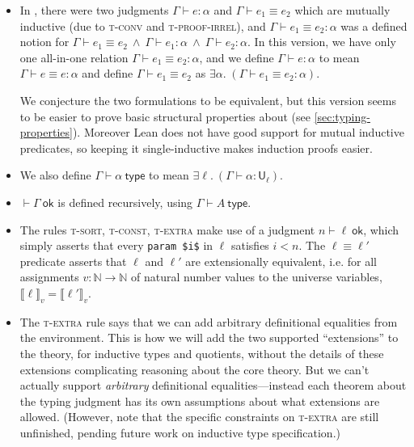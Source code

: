 \documentclass[sigplan,10pt,screen]{acmart}\settopmatter{printfolios=true,printccs=false,printacmref=false}
\newcommand{\N}{\mathbb{N}}
\newcommand{\U}{\mathsf{U}}
\newcommand{\ok}{\ \mathsf{ok}}
\newcommand{\type}{\ \mathsf{type}}
\newcommand{\scott}[1]{\llbracket #1\rrbracket}
\begin{document}
\begin{itemize}
  \item In \cite{leantt}, there were two judgments $\Gamma\vdash e:\alpha$ and $\Gamma\vdash e_1\equiv e_2$ which are mutually inductive (due to \textsc{t-conv} and \textsc{t-proof-irrel}), and $\Gamma\vdash e_1\equiv e_2:\alpha$ was a defined notion for $\Gamma\vdash e_1\equiv e_2\ \wedge\ \Gamma\vdash e_1:\alpha\ \wedge\ \Gamma\vdash e_2:\alpha$. In this version, we have only one all-in-one relation $\Gamma\vdash e_1\equiv e_2:\alpha$, and we define $\Gamma\vdash e:\alpha$ to mean $\Gamma\vdash e\equiv e:\alpha$ and define $\Gamma\vdash e_1\equiv e_2$ as $\exists\alpha.\;(\Gamma\vdash e_1\equiv e_2:\alpha)$.

  We conjecture the two formulations to be equivalent, but this version seems to be easier to prove basic structural properties about (see \autoref{sec:typing-properties}). Moreover Lean does not have good support for mutual inductive predicates, so keeping it single-inductive makes induction proofs easier.

  \item We also define $\Gamma\vdash \alpha\type$ to mean $\exists \ell.\ (\Gamma\vdash \alpha:\U_\ell)$.
  \item $\vdash\Gamma\ok$ is defined recursively, using $\Gamma\vdash A\type$.
  \item The rules \textsc{t-sort}, \textsc{t-const}, \textsc{t-extra} make use of a judgment $n\vdash \ell\ok$, which simply asserts that every \lstinline|param $i$| in $\ell$ satisfies $i<n$. The $\ell\equiv\ell'$ predicate asserts that $\ell$ and $\ell'$ are extensionally equivalent, i.e. for all assignments $v:\N\to\N$ of natural number values to the universe variables, $\scott{\ell}_{v}=\scott{\ell'}_{v}$.

  \item The \textsc{t-extra} rule says that we can add arbitrary definitional equalities from the environment. This is how we will add the two supported ``extensions'' to the theory, for inductive types and quotients, without the details of these extensions complicating reasoning about the core theory. But we can't actually support \emph{arbitrary} definitional equalities---instead each theorem about the typing judgment has its own assumptions about what extensions are allowed.  (However, note that the specific constraints on \textsc{t-extra} are still unfinished, pending future work on inductive type specification.)
\end{itemize}
\end{document}
